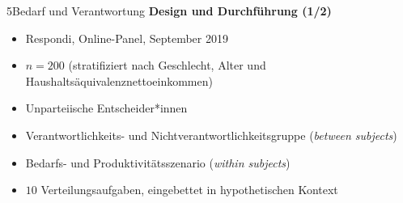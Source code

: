 \documentclass[xcolor=table,9pt,aspectratio=169]{beamer}
\begin{document}
\begin{frame}{\vspace*{10mm}5\hspace*{1em}Bedarf und Verantwortung}
\textbf{Design und Durchführung (1/2)}\\
\medskip
\begin{itemize}
   \item Respondi, Online-Panel, September 2019
   \item $n=200$ (stratifiziert nach Geschlecht, Alter und Haushaltsäquivalenznettoeinkommen)
   \item Unparteiische Entscheider*innen
   \item Verantwortlichkeits- und Nichtverantwortlichkeitsgruppe (\textit{between subjects})
   \item Bedarfs- und Produktivitätsszenario (\textit{within subjects})
   \item $10$ Verteilungsaufgaben, eingebettet in hypothetischen Kontext
\end{itemize}
\end{frame}
\end{document}
